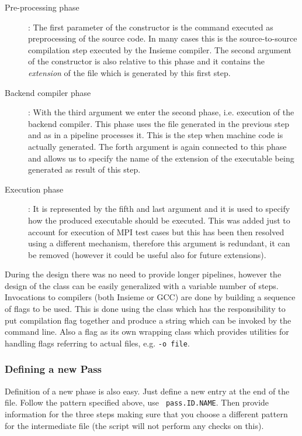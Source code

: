 \begin{description}

	\item[Pre-processing phase]: The first parameter of the 
		constructor is the command executed as preprocessing of the source code.
		In many cases this is the source-to-source compilation step executed by
		the Insieme compiler. The second argument of the constructor is also
		relative to this phase and it contains the {\em extension} of the file
		which is generated by this first step. 

	\item[Backend compiler phase]: With the third argument we enter the second
		phase, i.e. execution of the backend compiler. This phase uses the file
		generated in the previous step and as in a pipeline processes it. This is
		the step when machine code is actually generated. The forth argument is
		again connected to this phase and allows us to specify the name of the
		extension of the executable being generated as result of this step. 

	\item[Execution phase]: It is represented by the fifth and last argument and
		it is used to specify how the produced executable should be executed. This
		was added just to account for execution of MPI test cases but this has
		been then resolved using a different mechanism, therefore this argument is
		redundant, it can be removed (however it could be useful also for future
		extensions).

\end{description}

During the design there was no need to provide longer pipelines, however the
design of the  class can be easily generalized with a variable number
of steps. Invocations to compilers (both Insieme or GCC) are done by building a
sequence of flags to be used. This is done using the  class which has
the responsibility to put compilation flag together and produce a string which
can be invoked by the command line. Also a flag as its own wrapping class
 which provides utilities for handling flags referring to actual
files, e.g. {\tt -o file}.

\subsubsection{Defining a new Pass}

Definition of a new phase is also easy. Just define a new entry at the end of the
 file. Follow the pattern specified above, use {\tt
pass.ID.NAME}. Then provide information for the three steps making sure that
you choose a different pattern for the intermediate file (the script will not
perform any checks on this). 

